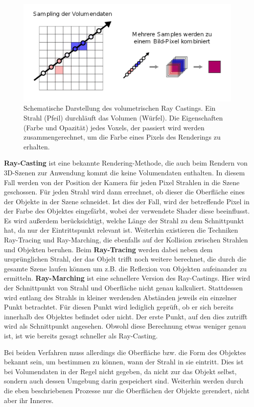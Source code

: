 \begin{figure}
	\centering
	\includegraphics[width=0.7\linewidth]{images/rayCasting.png}
	\caption{Schematische Darstellung des volumetrischen Ray Castings. Ein Strahl (Pfeil) durchläuft das Volumen (Würfel). Die Eigenschaften (Farbe und Opazität) jedes Voxels, der passiert wird werden zusammengerechnet, um die Farbe eines Pixels des Renderings zu erhalten.}
	\label{img:rayCasting}
\end{figure}

\textbf{Ray-Casting} ist eine bekannte Rendering-Methode, die auch beim Rendern von 3D-Szenen zur Anwendung kommt die keine Volumendaten enthalten.
In diesem Fall werden von der Position der Kamera für jeden Pixel Strahlen in die Szene geschossen. Für jeden Strahl wird dann errechnet, ob dieser die Oberfläche eines der Objekte in der Szene schneidet. Ist dies der Fall, wird der betreffende Pixel in der Farbe des Objektes eingefärbt, wobei der verwendete Shader diese beeinflusst. Es wird außerdem berücksichtigt, welche Länge der Strahl zu dem Schnittpunkt hat, da nur der Eintrittspunkt relevant ist.
Weiterhin existieren die Techniken Ray-Tracing und Ray-Marching, die ebenfalls auf der Kollision zwischen Strahlen und Objekten beruhen.
Beim \textbf{Ray-Tracing} werden dabei neben dem ursprünglichen Strahl, der das Objelt trifft noch weitere berechnet, die durch die gesamte Szene laufen können um z.B. die Reflexion von Objekten aufeinander zu ermitteln. 
\textbf{Ray-Marching} ist eine schnellere Version des Ray-Castings. Hier wird der Schnittpunkt von Strahl und Oberfläche nicht genau kalkuliert. Stattdessen wird entlang des Strahls in kleiner werdenden Abständen jeweils ein einzelner Punkt betrachtet. Für diesen Punkt wird lediglich geprüft, ob er sich bereits innerhalb des Objektes befindet oder nicht. Der erste Punkt, auf den dies zutrifft wird als Schnittpunkt angesehen. Obwohl diese Berechnung etwas weniger genau ist, ist wie bereits gesagt schneller als Ray-Casting.

Bei beiden Verfahren muss allerdings die Oberfläche bzw. die Form des Objektes bekannt sein, um bestimmen zu können, wann der Strahl in sie eintritt. Dies ist bei Volumendaten in der Regel nicht gegeben, da nicht zur das Objekt selbst, sondern auch dessen Umgebung darin gespeichert sind. Weiterhin werden durch die eben beschriebenen Prozesse nur die Oberflächen der Objekte gerendert, nicht aber ihr Inneres.

